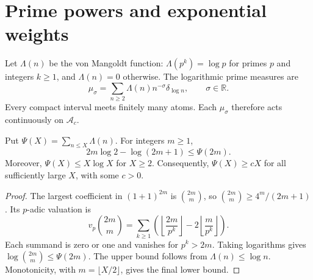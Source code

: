 \section{Prime powers and exponential weights}
\label{v4-arith:weil:primes}

Let \(\Lambda(n)\) be the von Mangoldt function:
\(\Lambda(p^k)=\log p\) for primes \(p\) and integers \(k\ge1\), and
\(\Lambda(n)=0\) otherwise. The logarithmic prime measures are
\begin{equation}
 \mu_\sigma=\sum_{n\ge2}\Lambda(n)n^{-\sigma}\delta_{\log n},
 \qquad \sigma\in\mathbb R.
 \label{v4-arith:weil:eq:prime-measure}
\end{equation}
Every compact interval meets finitely many atoms. Each \(\mu_\sigma\)
therefore acts continuously on \(\mathscr A_c\).

\begin{lemma}
\label{v4-arith:weil:lem:prime-mass}
Put \(\Psi(X)=\sum_{n\le X}\Lambda(n)\). For integers \(m\ge1\),
\[
 2m\log2-\log(2m+1)\le\Psi(2m).
\]
Moreover, \(\Psi(X)\le X\log X\) for \(X\ge2\). Consequently,
\(\Psi(X)\ge cX\) for all sufficiently large \(X\), with some \(c>0\).
\end{lemma}
\begin{proof}
The largest coefficient in \((1+1)^{2m}\) is \(\binom{2m}{m}\), so
\(\binom{2m}{m}\ge4^m/(2m+1)\). Its \(p\)-adic valuation is
\[
 v_p\binom{2m}{m}
 =\sum_{k\ge1}\left(
       \left\lfloor\frac{2m}{p^k}\right\rfloor
       -2\left\lfloor\frac m{p^k}\right\rfloor\right).
\]
Each summand is zero or one and vanishes for \(p^k>2m\).
Taking logarithms gives
\(\log\binom{2m}{m}\le\Psi(2m)\). The upper bound follows from
\(\Lambda(n)\le\log n\). Monotonicity, with \(m=\lfloor X/2\rfloor\),
gives the final lower bound.
\end{proof}

